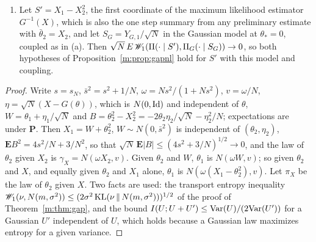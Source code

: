 \begin{proposition}
\begin{enumerate}[label=(\alph*),nosep]
\item Let $S'=X_1-X_2^2$, the first coordinate of the maximum likelihood estimator $G^{-1}(X)$, which is also the one step summary from any preliminary estimate with $\bar\theta_2=X_2$, and let $S_G=Y_{G,1}/\sqrt N$ in the Gaussian model at $\theta_\ast=0$, coupled as in (a). Then $\sqrt N\,E\,\mathscr{W}_1(\Pi(\cdot\mid S'),\Pi_G(\cdot\mid S_G))\to0$, so both hypotheses of Proposition~\ref{m:prop:gapnl} hold for $S'$ with this model and coupling.
\end{enumerate}
\end{proposition}

\begin{proof}
Write $s=s_N$, $\bar s^2=s^2+1/N$, $\omega=Ns^2/(1+Ns^2)$, $v=\omega/N$, $\eta=\sqrt N(X-G(\theta))$, which is $N(0,\operatorname{Id})$ and independent of $\theta$, $W=\theta_1+\eta_1/\sqrt N$ and $B=\theta_2^2-X_2^2=-2\theta_2\eta_2/\sqrt N-\eta_2^2/N$; expectations are under $\mathbf P$. Then $X_1=W+\theta_2^2$, $W\sim N(0,\bar s^2)$ is independent of $(\theta_2,\eta_2)$, $\mathbf EB^2=4s^2/N+3/N^2$, so that $\sqrt N\,\mathbf E|B|\le(4s^2+3/N)^{1/2}\to0$, and the law of $\theta_2$ given $X_2$ is $\gamma_X=N(\omega X_2,v)$. Given $\theta_2$ and $W$, $\theta_1$ is $N(\omega W,v)$; so given $\theta_2$ and $X$, and equally given $\theta_2$ and $X_1$ alone, $\theta_1$ is $N(\omega(X_1-\theta_2^2),v)$. Let $\pi_X$ be the law of $\theta_2$ given $X$. Two facts are used: the transport entropy inequality $\mathscr{W}_1(\nu,N(m,\sigma^2))\le(2\sigma^2\,\mathrm{KL}(\nu\,\|\,N(m,\sigma^2)))^{1/2}$ of the proof of Theorem~\ref{m:thm:gap}, and the bound $I(U;U+U')\le\mathrm{Var}(U)/(2\mathrm{Var}(U'))$ for a Gaussian $U'$ independent of $U$, which holds because a Gaussian law maximizes entropy for a given variance.


\end{proof}
